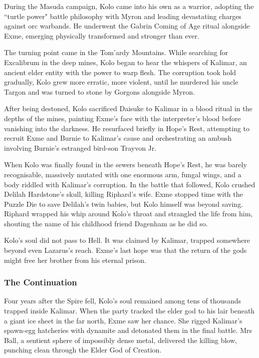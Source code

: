 During the Masuda campaign, Kolo came into his own as a warrior, adopting the ``turtle power" battle philosophy with Myron and leading devastating charges against orc warbands.  He underwent the Gabrin Coming of Age ritual alongside Exme, emerging physically transformed and stronger than ever.

The turning point came in the Tom'ardy Mountains.  While searching for Excalibrum in the deep mines, Kolo began to hear the whispers of Kalimar, an ancient elder entity with the power to warp flesh.  The corruption took hold gradually, Kolo grew more erratic, more violent, until he murdered his uncle Targon and was turned to stone by Gorgons alongside Myron.

After being destoned, Kolo sacrificed Daisuke to Kalimar in a blood ritual in the depths of the mines, painting Exme's face with the interpreter's blood before vanishing into the darkness.  He resurfaced briefly in Hope's Rest, attempting to recruit Exme and Burnie to Kalimar's cause and orchestrating an ambush involving Burnie's estranged bird-son Trayvon Jr.

When Kolo was finally found in the sewers beneath Hope's Rest, he was barely recognisable, massively mutated with one enormous arm, fungal wings, and a body riddled with Kalimar's corruption.  In the battle that followed, Kolo crushed Delilah Hardstone's skull, killing Riphard's wife.  Exme stopped time with the Puzzle Die to save Delilah's twin babies, but Kolo himself was beyond saving.  Riphard wrapped his whip around Kolo's throat and strangled the life from him, shouting the name of his childhood friend Dagenham as he did so.

Kolo's soul did not pass to Hell.  It was claimed by Kalimar, trapped somewhere beyond even Lazarus's reach.  Exme's last hope was that the return of the gods might free her brother from his eternal prison.

\subsubsection{The Continuation}

Four years after the Spire fell, Kolo's soul remained among tens of thousands trapped inside Kalimar.  When the party tracked the elder god to his lair beneath a giant ice sheet in the far north, Exme saw her chance.  She rigged Kalimar's spawn-egg hatcheries with dynamite and detonated them in the final battle.  Mrs Ball, a sentient sphere of impossibly dense metal, delivered the killing blow, punching clean through the Elder God of Creation.

